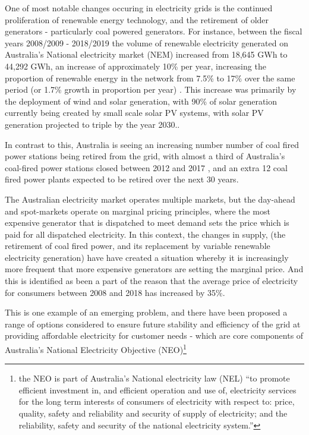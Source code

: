 One of most notable changes occuring in electricity grids is the continued proliferation of renewable energy technology, and the retirement of older generators - particularly coal powered generators.
For instance, between the fiscal years 2008/2009 - 2018/2019 the volume of renewable electricity generated on Australia's National electricity market (NEM) increased from 18,645 GWh to 44,292 GWh, an increase of approximately 10\% per year, increasing the proportion of renewable energy in the network from 7.5\% to 17\% over the same period (or 1.7\% growth in proportion per year)
\cite{departmentoftheenvironmentenergy2018}.
This increase was primarily by the deployment of wind and solar generation, with 90\% of solar generation currently being created by small scale solar PV systems, with solar PV generation projected to triple by the year 2030.\cite{australianenergymarketoperatorlimited2018}.

In contrast to this, Australia is seeing an increasing number number of coal fired power stations being retired from the grid,
with almost a third of Australia's coal-fired power stations closed between 2012 and 2017 \cite{doi:10.1111/1467-8489.12289},
and an extra 12 coal fired power plants expected to be retired over the next 30 years.\cite{australianenergymarketoperatorlimited2018}

The Australian electricity market operates multiple markets, but the day-ahead and spot-markets operate on marginal pricing principles, where the most expensive generator that is dispatched to meet demand sets the price which is paid for all dispatched electricity.
In this context, the changes in supply, (the retirement of coal fired power, and its replacement by variable renewable electricity generation) have have created a situation whereby it is increasingly more frequent that more expensive generators are setting the marginal price.
And this is identified as been a part of the reason that the average price of electricity for consumers between 2008 and 2018 has increased by 35\%. \cite{australiancompetitionconsumercommission2018}

This is one example of an emerging problem, and there have been proposed a range of options considered to ensure future stability and efficiency of the grid at providing affordable electricity for customer needs - which are core components of Australia's National Electricity Objective (NEO)\footnote{the NEO is part of Australia's National electricity law (NEL) ``to promote efficient investment in, and efficient operation and use of, electricity services for the long term interests of consumers of electricity with respect to: price, quality, safety and reliability and security of supply of electricity; and the reliability, safety and security of the national electricity system.''}

